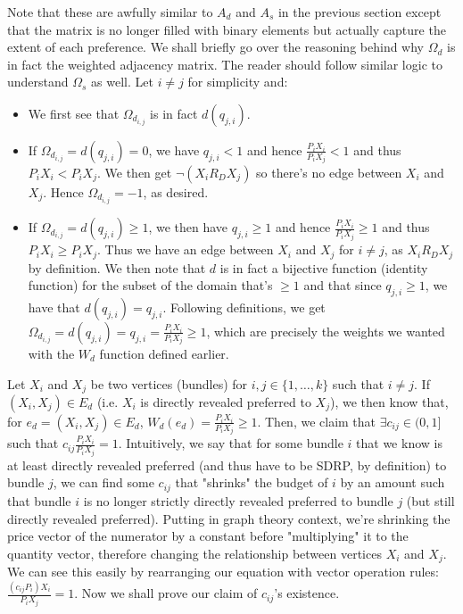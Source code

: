 \documentclass{article} %
\begin{document}
Note that these are awfully similar to $A_d$ and $A_s$ in the previous section except that the matrix is no longer filled with binary elements but actually capture the extent of each preference. We shall briefly go over the reasoning behind why $\Omega_d$ is in fact the weighted adjacency matrix. The reader should follow similar logic to understand $\Omega_s$ as well. Let $i\not=j$ for simplicity and:
\begin{itemize}
  \item We first see that $\Omega_{d_{i,j}}$ is in fact $d(q_{j,i})$.
  \item If $\Omega_{d_{i,j}}=d(q_{j,i})=0$, we have $q_{j,i}<1$ and hence $\frac{P_iX_i}{P_iX_j}<1$ and thus $P_iX_i<P_iX_j$. We then get $\neg(X_i R_D X_j)$ so there's no edge between $X_i$ and $X_j$. Hence $\Omega_{d_{i,j}}=-1$, as desired.
  \item If $\Omega_{d_{i,j}}=d(q_{j,i})\geq1$, we then have $q_{j,i}\geq1$ and hence $\frac{P_iX_i}{P_iX_j}\geq1$ and thus $P_iX_i\geq P_iX_j$. Thus we have an edge between $X_i$ and $X_j$ for $i\not=j$, as $X_iR_D X_j$ by definition. We then note that $d$ is in fact a bijective function (identity function) for the subset of the domain that's $\geq1$ and that since $q_{j,i}\geq1$, we have that $d(q_{j,i})=q_{j,i}$. Following definitions, we get $\Omega_{d_{i,j}}=d(q_{j,i})=q_{j,i}=\frac{P_iX_i}{P_iX_j}\geq1$, which are precisely the weights we wanted with the $W_d$ function defined earlier.
\end{itemize}
Let $X_i$ and $X_j$ be two vertices (bundles) for $i,j\in\{1,\ldots,k\}$ such that $i\not=j$. If $(X_i, X_j)\in E_d$ (i.e. $X_i$ is directly revealed preferred to $X_j$), we then know that, for $e_d=(X_i, X_j)\in E_d$, $W_d(e_d)=\frac{P_iX_i}{P_iX_j}\geq1$. Then, we claim that $\exists c_{ij}\in(0,1]$ such that $c_{ij}\frac{P_iX_i}{P_iX_j}=1$. Intuitively, we say that for some bundle $i$ that we know is at least directly revealed preferred (and thus have to be SDRP, by definition) to bundle $j$, we can find some $c_{ij}$ that "shrinks" the budget of $i$ by an amount such that bundle $i$ is no longer strictly directly revealed preferred to bundle $j$ (but still directly revealed preferred). Putting in graph theory context, we're shrinking the price vector of the numerator by a constant before "multiplying" it to the quantity vector, therefore changing the relationship between vertices $X_i$ and $X_j$. We can see this easily by rearranging our equation with vector operation rules: $\frac{(c_{ij}P_i)X_i}{P_iX_j}=1$. Now we shall prove our claim of $c_{ij}$'s existence.
\end{document}
